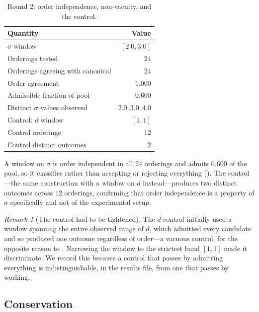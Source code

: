 \documentclass[11pt,twocolumn,a4paper]{article}
\theoremstyle{upthm}
\theoremstyle{definition}
\theoremstyle{remark}
\newtheorem{remark}[theorem]{Remark}
\newcommand{\sep}{\sigma}
\newcommand{\dep}{d}
\begin{document}
\begin{table}[htbp]
\centering\small
\caption{Round 2: order independence, non-vacuity, and the control.}
\label{tab:round2}
\begin{tabular}{@{}lr@{}}
\toprule
Quantity & Value\\
\midrule
$\sep$ window & $[2.0,3.0]$\\
Orderings tested & $24$\\
Orderings agreeing with canonical & $24$\\
Order agreement & $1.000$\\
Admissible fraction of pool & $0.600$\\
Distinct $\sep$ values observed & $2.0,3.0,4.0$\\
\midrule
Control: $\dep$ window & $[1,1]$\\
Control orderings & $12$\\
Control distinct outcomes & $2$\\
\bottomrule
\end{tabular}
\end{table}

A window on $\sep$ is order independent in all $24$ orderings and admits
$0.600$ of the pool, so it classifies rather than accepting or rejecting
everything (). The control---the same construction with
a window on $\dep$ instead---produces two distinct outcomes across $12$
orderings, confirming that order independence is a property of $\sep$
specifically and not of the experimental setup.

\begin{remark}[The control had to be tightened]
\label{rem:tighten}
The $\dep$ control initially used a window spanning the entire observed
range of $\dep$, which admitted every candidate and so produced one
outcome regardless of order---a vacuous control, for the opposite reason
to . Narrowing the window to the strictest band
$[1,1]$ made it discriminate. We record this because a control that
passes by admitting everything is indistinguishable, in the results file,
from one that passes by working.
\end{remark}

\subsection{Conservation}
\end{document}
